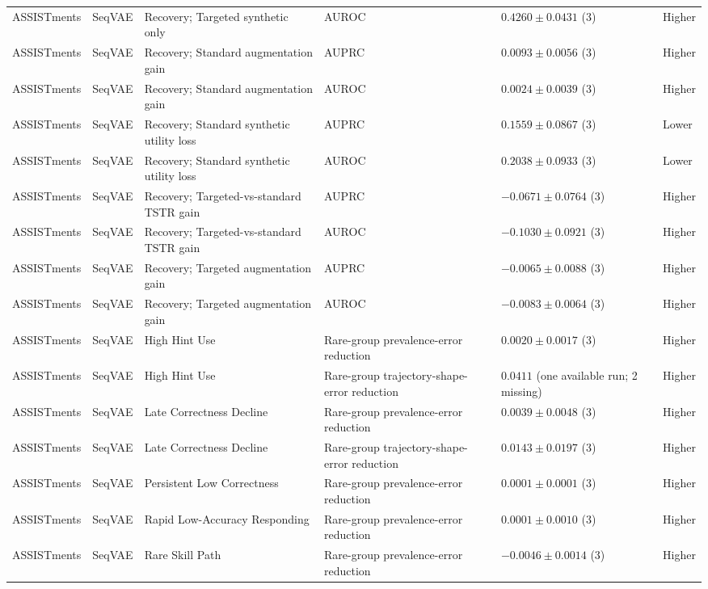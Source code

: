 \begin{longtable}{@{}p{2.25cm}p{2.05cm}p{4.7cm}p{5.0cm}p{2.6cm}p{1.25cm}@{}}
ASSISTments & SeqVAE & Recovery; Targeted synthetic only & AUROC & $0.4260 \mathbin{\pm} 0.0431$ (3) & Higher \\
ASSISTments & SeqVAE & Recovery; Standard augmentation gain & AUPRC & $0.0093 \mathbin{\pm} 0.0056$ (3) & Higher \\
ASSISTments & SeqVAE & Recovery; Standard augmentation gain & AUROC & $0.0024 \mathbin{\pm} 0.0039$ (3) & Higher \\
ASSISTments & SeqVAE & Recovery; Standard synthetic utility loss & AUPRC & $0.1559 \mathbin{\pm} 0.0867$ (3) & Lower \\
ASSISTments & SeqVAE & Recovery; Standard synthetic utility loss & AUROC & $0.2038 \mathbin{\pm} 0.0933$ (3) & Lower \\
ASSISTments & SeqVAE & Recovery; Targeted-vs-standard TSTR gain & AUPRC & $-0.0671 \mathbin{\pm} 0.0764$ (3) & Higher \\
ASSISTments & SeqVAE & Recovery; Targeted-vs-standard TSTR gain & AUROC & $-0.1030 \mathbin{\pm} 0.0921$ (3) & Higher \\
ASSISTments & SeqVAE & Recovery; Targeted augmentation gain & AUPRC & $-0.0065 \mathbin{\pm} 0.0088$ (3) & Higher \\
ASSISTments & SeqVAE & Recovery; Targeted augmentation gain & AUROC & $-0.0083 \mathbin{\pm} 0.0064$ (3) & Higher \\
ASSISTments & SeqVAE & High Hint Use & Rare-group prevalence-error reduction & $0.0020 \mathbin{\pm} 0.0017$ (3) & Higher \\
ASSISTments & SeqVAE & High Hint Use & Rare-group trajectory-shape-error reduction & $0.0411$ (one available run; 2 missing) & Higher \\
ASSISTments & SeqVAE & Late Correctness Decline & Rare-group prevalence-error reduction & $0.0039 \mathbin{\pm} 0.0048$ (3) & Higher \\
ASSISTments & SeqVAE & Late Correctness Decline & Rare-group trajectory-shape-error reduction & $0.0143 \mathbin{\pm} 0.0197$ (3) & Higher \\
ASSISTments & SeqVAE & Persistent Low Correctness & Rare-group prevalence-error reduction & $0.0001 \mathbin{\pm} 0.0001$ (3) & Higher \\
ASSISTments & SeqVAE & Rapid Low-Accuracy Responding & Rare-group prevalence-error reduction & $0.0001 \mathbin{\pm} 0.0010$ (3) & Higher \\
ASSISTments & SeqVAE & Rare Skill Path & Rare-group prevalence-error reduction & $-0.0046 \mathbin{\pm} 0.0014$ (3) & Higher \\

\end{longtable}
